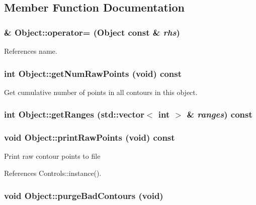 \subsection{Member Function Documentation}
\hypertarget{classObject_d5a622757f2d91f0b3fc41b8af751d6f}{
\subsubsection[operator=]{ \& Object::operator= ({\bf Object} const \& {\em rhs})}}
\label{classObject_d5a622757f2d91f0b3fc41b8af751d6f}




References name.\hypertarget{classObject_6aaf101247a2ae13d5a1801e75184d7d}{
\subsubsection[getNumRawPoints]{\setlength{\rightskip}{0pt plus 5cm}int Object::getNumRawPoints (void) const}}
\label{classObject_6aaf101247a2ae13d5a1801e75184d7d}


Get cumulative number of points in all contours in this object. \hypertarget{classObject_dcde331995062eec9ba70c6f88ef5086}{
\subsubsection[getRanges]{\setlength{\rightskip}{0pt plus 5cm}int Object::getRanges (std::vector$<$ int $>$ \& {\em ranges}) const}}
\label{classObject_dcde331995062eec9ba70c6f88ef5086}


\hypertarget{classObject_547991c3188f392ce00323b192142e98}{
\subsubsection[printRawPoints]{\setlength{\rightskip}{0pt plus 5cm}void Object::printRawPoints (void) const}}
\label{classObject_547991c3188f392ce00323b192142e98}


Print raw contour points to file 

References Controls::instance().\hypertarget{classObject_2a840530103821a55da4c585c0aa1fb7}{
\subsubsection[purgeBadContours]{\setlength{\rightskip}{0pt plus 5cm}void Object::purgeBadContours (void)}}
\label{classObject_2a840530103821a55da4c585c0aa1fb7}


